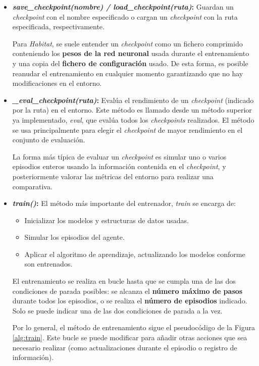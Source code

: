 \begin{itemize}
	\item \textbf{\textit{save{\_}checkpoint(nombre) / load{\_}checkpoint(ruta)}:} Guardan un \textit{checkpoint} con el nombre especificado o cargan un \textit{checkpoint} con la ruta especificada, respectivamente.
	
	Para \textit{Habitat}, se suele entender un \textit{checkpoint} como un fichero comprimido conteniendo los \textbf{pesos de la red neuronal} usada durante el entrenamiento y una copia del \textbf{fichero de configuración} usado. De esta forma, es posible reanudar el entrenamiento en cualquier momento garantizando que no hay modificaciones en el entorno.
	
	\item \textbf{\textit{{\_}eval{\_}checkpoint(ruta)}:} Evalúa el rendimiento de un \textit{checkpoint} (indicado por la ruta) en el entorno. Este método es llamado desde un método superior ya implementado, \textit{eval}, que evalúa todos los \textit{checkpoints} realizados. El método se usa principalmente para elegir el \textit{checkpoint} de mayor rendimiento en el conjunto de evaluación.
	
	La forma más típica de evaluar un \textit{checkpoint} es simular uno o varios episodios enteros usando la información contenida en el \textit{checkpoint}, y posteriormente valorar las métricas del entorno para realizar una comparativa. 

	\item \textbf{\textit{train()}:} El método más importante del entrenador, \textit{train} se encarga de:
	\begin{itemize}
		\item Inicializar los modelos y estructuras de datos usadas.
		\item Simular los episodios del agente.
		\item Aplicar el algoritmo de aprendizaje, actualizando los modelos conforme son entrenados.
	\end{itemize}
	
	El entrenamiento se realiza en bucle hasta que se cumpla una de las dos condiciones de parada posibles: se alcanza el \textbf{número máximo de pasos} durante todos los episodios, o se realiza el \textbf{número de episodios} indicado. Solo se puede indicar una de las dos condiciones de parada a la vez.
	
	Por lo general, el método de entrenamiento sigue el pseudocódigo de la Figura \ref{alg:train}. Este bucle se puede modificar para añadir otras acciones que sea necesario realizar (como actualizaciones durante el episodio o registro de información).
	

\end{itemize}
